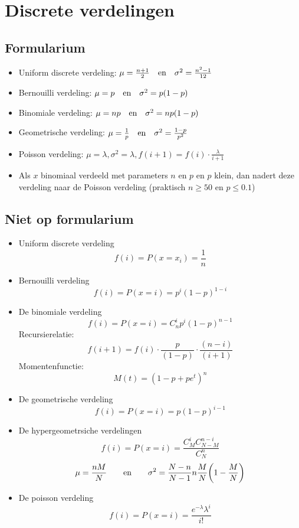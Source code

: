 \documentclass[12pt]{report}
\begin{document}
\chapter{Discrete verdelingen}
 \section{Formularium}
 \begin{itemize}
  \item Uniform discrete verdeling: $\mu = \frac{n + 1}{2}\quad\hbox{en}\quad \sigma^2 = \frac{n^2 - 1}{12}$
  \item Bernouilli verdeling: $\mu = p\quad\hbox{en}\quad \sigma^2 = p(1 - p)$
  \item Binomiale verdeling: $\mu = np\quad\hbox{en}\quad \sigma^2 = np(1 - p)$
  \item Geometrische verdeling: $\mu = \frac{1}{p}\quad\hbox{en}\quad \sigma^2 = \frac{1-p}{p^2}$
  \item Poisson verdeling: $\mu = \lambda, \sigma^2 = \lambda, f(i + 1) = f(i)\cdot\frac{\lambda}{i + 1}$
  \item Als $x$ binomiaal verdeeld met parameters $n$ en $p$ en $p$ klein, dan nadert deze verdeling naar de Poisson verdeling (praktisch $n \geq 50$ en $p \leq 0.1$)
 \end{itemize}
 \section{Niet op formularium}
 \begin{itemize}
  \item Uniform discrete verdeling
    $$f(i) = P(x = x_i) = \frac{1}{n}$$
  \item Bernouilli verdeling
    $$f(i) = P(x = i) = p^i(1 - p)^{1 - i}$$
  \item De binomiale verdeling
    $$f(i) = P(x = i) = C_n^ip^i( 1 -p)^{n - 1}$$
    Recursierelatie: $$f(i + 1) = f(i)\cdot\frac{p}{(1 - p)}\cdot\frac{(n - i)}{(i + 1)}$$
    Momentenfunctie: $$M(t) = (1 - p + pe^t)^n$$
  \item De geometrische verdeling
    $$f(i) = P(x = i) = p(1 - p)^{i - 1}$$
  \item De hypergeometrsiche verdelingen
    $$f(i) = P(x = i) = \frac{C_M^iC_{N - M}^{n - i}}{C_N^n}$$
    $$\mu = \frac{nM}{N}\qquad\hbox{en}\qquad{\sigma^2 = \frac{N - n}{N - 1}n\frac{M}{N}\bigg(1 - \frac{M}{N}\bigg)}$$
  \item De poisson verdeling
    $$f(i) = P(x = i) = \frac{e^{-\lambda}\lambda^i}{i!}$$
 \end{itemize}
\end{document}
